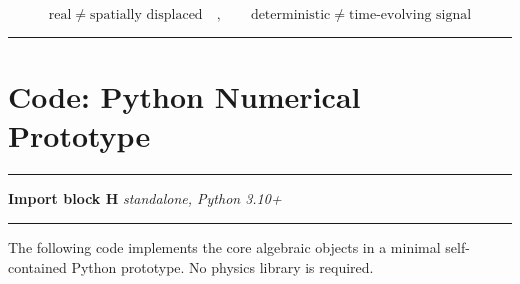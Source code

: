 \documentclass[11pt, a4paper, oneside]{article}
\theoremstyle{definition}
\theoremstyle{plain}
\theoremstyle{remark}
\begin{document}
\begin{equation}
  \text{real} \neq \text{spatially displaced}
  \quad,\qquad
  \text{deterministic} \neq \text{time-evolving signal}
  \tag{G.7}
\end{equation}

\noindent\rule{\linewidth}{0.4pt}

\section{Code: Python Numerical Prototype}
\label{sec:code-python}

\noindent\rule{\linewidth}{0.8pt}
\textbf{Import block H} \hfill \textit{standalone, Python 3.10+}
\noindent\rule{\linewidth}{0.4pt}

The following code implements the core algebraic objects in a minimal
self-contained Python prototype. No physics library is required.
\end{document}
